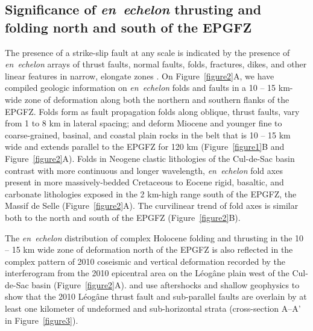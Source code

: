 \documentclass[linenumbers,draft]{agujournal}
\begin{document}
\subsection{Significance of \textit{en~echelon} thrusting and folding north and south of the EPGFZ}
The presence of a strike-slip fault at any scale is indicated by the presence of \textit{en~echelon} arrays of thrust faults, normal faults, folds, fractures, dikes, and other linear features in narrow, elongate zones \citep{sylvester1988strike}. On Figure~\ref{figure2}A, we have compiled geologic information on \textit{en~echelon} folds and faults in a 10 -- 15 km-wide zone of deformation along both the northern and southern flanks of the EPGFZ. Folds form as fault propagation folds along oblique, thrust faults, vary from 1 to 8 km in lateral spacing; and deform Miocene and younger fine to coarse-grained, basinal, and coastal plain rocks in the belt that is 10 -- 15 km wide and extends parallel to the EPGFZ for 120 km (Figure~\ref{figure1}B and Figure~\ref{figure2}A). Folds in Neogene clastic lithologies of the Cul-de-Sac basin contrast with more continuous and longer wavelength, \textit{en~echelon} fold axes present in more massively-bedded Cretaceous to Eocene rigid, basaltic, and carbonate lithologies exposed in the 2 km-high range south of the EPGFZ, the Massif de Selle (Figure~\ref{figure2}A). The curvilinear trend of fold axes is similar both to the north and south of the EPGFZ (Figure~\ref{figure2}B). 

The \textit{en~echelon} distribution of complex Holocene folding and thrusting in the 10 -- 15 km wide zone of deformation north of the EPGFZ is also reflected in the complex pattern of 2010 coseismic and vertical deformation recorded by the interferogram from the 2010 epicentral area on the L\'eog\^ane plain west of the Cul-de-Sac basin \citep{hayes2010complex,hashimoto2011fan,bilham2013remote} (Figure~\ref{figure2}A). \citet{douilly2013crustal,douilly2015three} and \citet{kocel2016near} use aftershocks and shallow geophysics to show that the 2010 L\'eog\^ane thrust fault and sub-parallel faults are overlain by at least one kilometer of undeformed and sub-horizontal strata (cross-section A--A' in Figure~\ref{figure3}).
\end{document}

